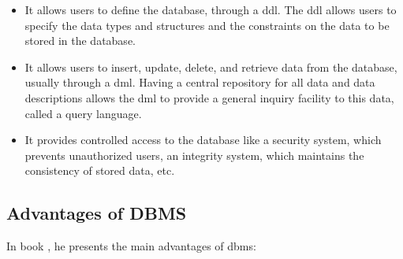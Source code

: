 \begin{itemize}
    \item It allows users to define the database, through a \gls{ddl}. The \gls{ddl} allows users to specify the data types and structures and the constraints on the data to be stored in the database.
    \item It allows users to insert, update, delete, and retrieve data from the database, usually through a \gls{dml}. Having a central repository for all data and data descriptions allows the \gls{dml} to provide a general inquiry facility to this data, called a query language.
    \item   It provides controlled access to the database like a security system, which prevents unauthorized users, an integrity system, which maintains the consistency of stored data, etc.
\end{itemize}


\subsection{Advantages of DBMS}


In \citeauthor{gehrke_2002} book \cite{gehrke_2002}, he presents the main advantages of \gls{dbms}:

